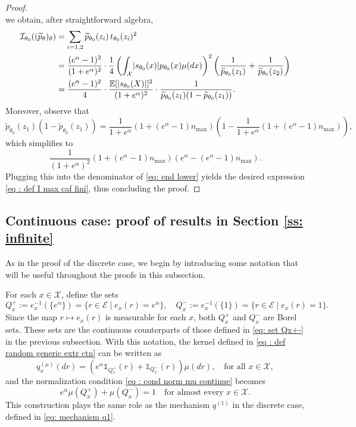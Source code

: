 \documentclass[a4paper, 11pt]{article}
\theoremstyle{definition}
\newcommand{\E}{{\mathbb{E}}}
\newcommand{\cI}{{\mathcal{I}}}
\newcommand{\cX}{{\mathcal{X}}}
\newcommand{\indi}[1]{\mathds{1}_{#1}}
\DeclarePairedDelimiter{\abs}{\lvert}{\rvert}
\begin{document}
{\begin{proof}
\[\]
we obtain, after straightforward algebra,
\begin{align}\label{eq: end lower}
\cI_{\theta_0}((\widetilde{p}_\theta)_\theta) 
&= \sum_{i = 1, 2} \widetilde{p}_{\theta_0}(z_i) \, t_{\theta_0}(z_i)^2 \notag \\
&= \frac{(e^\alpha - 1)^2}{(1 + e^\alpha)^2} \cdot \frac{1}{4} \left( \int_\cX \abs{s_{\theta_0}(x)} p_{\theta_0}(x) \mu(dx) \right)^2 \left( \frac{1}{\widetilde{p}_{\theta_0}(z_1)} + \frac{1}{\widetilde{p}_{\theta_0}(z_2)} \right) \notag \\
&= \frac{(e^\alpha - 1)^2}{4} \cdot \frac{\E[\abs{s_{\theta_0}(X)}]^2}{(1 + e^\alpha)^2} \cdot \frac{1}{\widetilde{p}_{\theta_0}(z_1)(1 - \widetilde{p}_{\theta_0}(z_1))}.
\end{align}
Moreover, observe that
\[
\widetilde{p}_{\theta_0}(z_1)(1 - \widetilde{p}_{\theta_0}(z_1)) = 
\frac{1}{1 + e^\alpha} \left( 1 + (e^\alpha - 1) n_{\max} \right)
\left( 1 - \frac{1}{1 + e^\alpha} (1 + (e^\alpha - 1) n_{\max}) \right),
\]
which simplifies to
\[
\frac{1}{(1 + e^\alpha)^2} \left( 1 + (e^\alpha - 1) n_{\max} \right) \left( e^\alpha - (e^\alpha - 1) n_{\max} \right).
\]
Plugging this into the denominator of \eqref{eq: end lower} yields the desired expression \eqref{eq : def I max caf fini}, thus concluding the proof.
\end{proof}	

\subsection{Continuous case: proof of results in Section \ref{ss: infinite}}{\label{ss: proof cont}}

As in the proof of the discrete case, we begin by introducing some notation that will be useful throughout the proofs in this subsection.

 For each $x \in \mathcal{X}$, define the sets
\[
Q^+_x := e_x^{-1}(\{e^\alpha\}) = \{ r \in \mathcal{E} \mid e_x(r) = e^\alpha \}, \quad
Q^-_x := e_x^{-1}(\{1\}) = \{ r \in \mathcal{E} \mid e_x(r) = 1 \}.
\]
Since the map $r \mapsto e_x(r)$ is measurable for each $x$, both $Q^+_x$ and $Q^-_x$ are Borel sets. These sets are the continuous counterparts of those defined in \eqref{eq: set Qx+-} in the previous subsection. With this notation, the kernel defined in \eqref{eq : def random generic extr ctn} can be written as
\[
q^{(\mu)}_x(dr) = \left( e^\alpha \indi{Q^+_x}(r) + \indi{Q^-_x}(r) \right) \mu(dr), \quad \text{for all } x \in \mathcal{X},
\]
and the normalization condition \eqref{eq : cond norm mu continue} becomes
\[
e^\alpha \mu(Q^+_x) + \mu(Q^-_x) = 1 \quad \text{for almost every } x \in \mathcal{X}.
\]
This construction plays the same role as the mechanism $q^{(1)}$ in the discrete case, defined in \eqref{eq: mechanism q1}.

}
\end{document}
